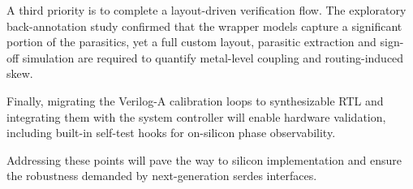 A third priority is to complete a layout-driven verification flow. The exploratory back-annotation study confirmed that the wrapper models capture a significant portion of the parasitics, yet a full custom layout, parasitic extraction and sign-off simulation are required to quantify metal-level coupling and routing-induced skew. 

Finally, migrating the Verilog-A calibration loops to synthesizable RTL and integrating them with the system controller will enable hardware validation, including built-in self-test hooks for on-silicon phase observability. 

Addressing these points will pave the way to silicon implementation and ensure the robustness demanded by next-generation \gls{serdes} interfaces.

